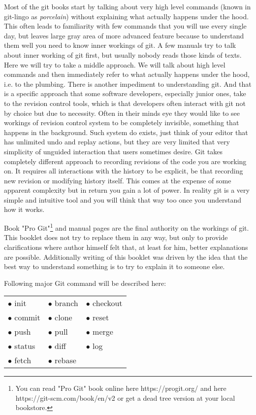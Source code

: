 \documentclass{article}
\theoremstyle{definition}
\begin{document}
        Most of the git books start by talking about very high level commands (known in git-lingo as {\em porcelain})
        without explaining what actually happens under the hood. This often leads to familiarity with few commands that you
        will use every single day, but leaves large gray area of more advanced feature because to understand them well you
        need to know inner workings of git. A few manuals try to talk about inner working of git first, but usually nobody
        reads those kinds of texts. Here we will try to take a middle approach. We will talk about high level commands and
        then immediately refer to what actually happens under the hood, i.e. to the plumbing. There is another impediment to
        understanding git. And that is a specific approach that some software developers, especially junior ones, take to
        the revision control tools, which is that developers often interact with git not by choice but due to necessity.
        Often in their minds eye they would like to see workings of revision control system to be completely invisible,
        something that happens in the background. Such system do exists, just think of your editor that has unlimited undo
        and replay actions, but they are very limited that very simplicity of unguided interaction that users sometimes
        desire. Git takes completely different approach to recording revisions of the code you are working on. It requires
        all interactions with the history to be explicit, be that recording new revision or modifying history itself.
        This comes at the expense of some apparent complexity but in return you gain a lot of power. In reality git is a
        very simple and intuitive tool and you will think that way too once you understand how it works.

        Book "Pro Git"\footnote{You can read "Pro Git" book online here https://progit.org/ and here
        https://git-scm.com/book/en/v2 or get a dead tree version at your local bookstore.} and manual pages are the final
        authority on the workings of git. This booklet does not try to replace them in any way, but only to provide
        clarifications where author himself felt that, at least for him, better explanations are possible. Additionally
        writing of this booklet was driven by the idea that the best way to understand something is to try to explain it to
        someone else.

        Following major Git command will be described here:

        \begin{center}
        \begin{tabular}{ l l l }
        $\bullet$ init & $\bullet$ branch & $\bullet$ checkout \\
        $\bullet$ commit & $\bullet$ clone & $\bullet$ reset \\
        $\bullet$ push & $\bullet$ pull & $\bullet$ merge \\
        $\bullet$ status & $\bullet$ diff & $\bullet$ log \\
        $\bullet$ fetch & $\bullet$ rebase
        \end{tabular}
        \end{center}
\end{document}
